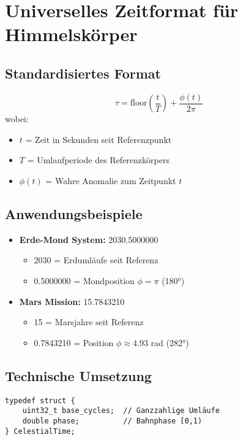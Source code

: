 \section{Universelles Zeitformat für Himmelskörper}

\subsection{Standardisiertes Format}
\begin{equation}
\tau = \text{floor}\left(\frac{t}{T}\right) + \frac{\phi(t)}{2\pi}
\end{equation}
wobei:
\begin{itemize}
    \item $t$ = Zeit in Sekunden seit Referenzpunkt
    \item $T$ = Umlaufperiode des Referenzkörpers
    \item $\phi(t)$ = Wahre Anomalie zum Zeitpunkt $t$
\end{itemize}

\subsection{Anwendungsbeispiele}
\begin{itemize}
    \item \textbf{Erde-Mond System:} 2030.5000000
    \begin{itemize}
        \item 2030 = Erdumläufe seit Referenz
        \item 0.5000000 = Mondposition $\phi = \pi$ (180°)
    \end{itemize}
    
    \item \textbf{Mars Mission:} 15.7843210
    \begin{itemize}
        \item 15 = Marsjahre seit Referenz
        \item 0.7843210 = Position $\phi \approx 4.93$ rad (282°)
    \end{itemize}
\end{itemize}

\subsection{Technische Umsetzung}
\begin{verbatim}
typedef struct {
    uint32_t base_cycles;  // Ganzzahlige Umläufe
    double phase;          // Bahnphase [0,1)
} CelestialTime;
\end{verbatim}

